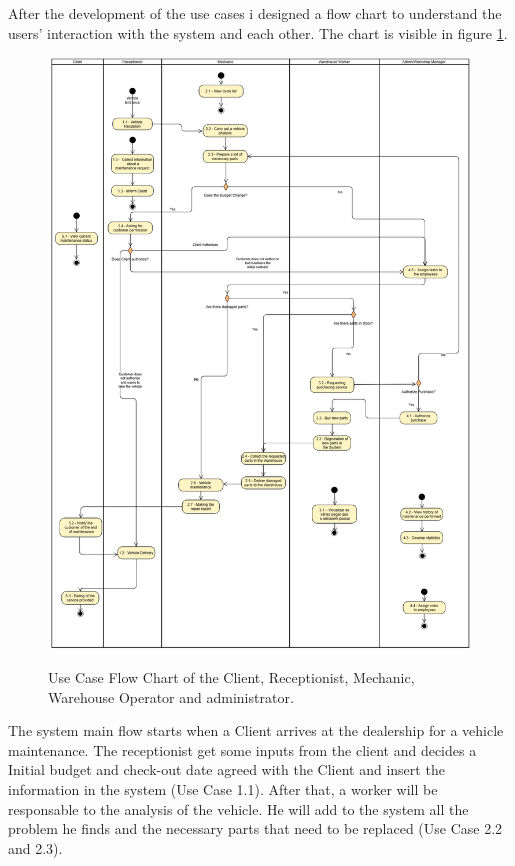 After the development of the use cases i designed a flow chart to understand the users' interaction with the system and each other. The chart is visible in figure \ref{fig:figure2}.

\begin{figure}[h]
  \caption{Use Case Flow Chart of the Client, Receptionist, Mechanic, Warehouse Operator and administrator.}
  \centering
  \includegraphics[width=\textwidth]{figs/UseCaseDiagram}
  \label{fig:figure2}
\end{figure}

The system main flow starts when a Client arrives at the dealership for a vehicle maintenance. 
The receptionist get some inputs from the client and decides a Initial budget and check-out date agreed with the Client and insert the information in the system (Use Case 1.1).
After that, a worker will be responsable to the analysis of the vehicle. 
He will add to the system all the problem he finds and the necessary parts that need to be replaced (Use Case 2.2 and 2.3).


